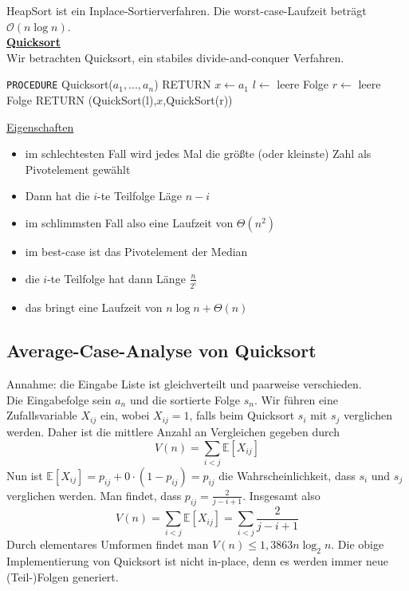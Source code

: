\documentclass[a4paper, 12pt]{article}
\begin{document}
	HeapSort ist ein Inplace-Sortierverfahren. Die worst-case-Laufzeit beträgt $\mathcal{O}(n\log n)$.\\
	\underline{\textbf{Quicksort}}\\
	Wir betrachten Quicksort, ein stabiles divide-and-conquer Verfahren.
	\begin{algorithmic}
		\State\texttt{PROCEDURE} Quicksort($a_1,...,a_n$)
			\State RETURN
		\EndIf
		\State $x\gets a_1$
		\State $l \gets$ leere Folge
		\State $r \gets$ leere Folge
			{
			\Else
			\EndIf}
		\EndFor
		\State RETURN (QuickSort(l),$x$,QuickSort(r))
	\end{algorithmic}
	\underline{Eigenschaften} \begin{itemize}
		\item im schlechtesten Fall wird jedes Mal die größte (oder kleinste) Zahl als Pivotelement gewählt
		\item Dann hat die $i$-te Teilfolge Läge $n-i$
		\item im schlimmsten Fall also eine Laufzeit von $\Theta(n^2)$
		\item im best-case ist das Pivotelement der Median
		\item die $i$-te Teilfolge hat dann Länge $\frac{n}{2^i}$ 
		\item das bringt eine Laufzeit von $n\log n + \Theta(n)$
	\end{itemize}
	\subsection{Average-Case-Analyse von Quicksort}
	Annahme: die Eingabe Liste ist gleichverteilt und paarweise verschieden.\\
	Die Eingabefolge sein $a_n$ und die sortierte Folge $s_n$. Wir führen eine Zufallsvariable $X_{ij}$ ein, wobei $X_{ij} = 1$, falls beim Quicksort $s_i$ mit $s_j$ verglichen werden. Daher ist die mittlere Anzahl an Vergleichen gegeben durch \[V(n) = \sum_{i<j}\mathbb{E}[X_{ij}]\]
	Nun ist $\mathbb{E}[X_{ij}] = p_{ij} + 0\cdot (1-p_{ij}) = p_{ij}$ die Wahrscheinlichkeit, dass $s_i$ und $s_j$ verglichen werden. Man findet, dass $p_{ij} = \frac{2}{j-i+1}$. Insgesamt also \[V(n) = \sum_{i<j} \mathbb{E}[X_{ij}] = \sum_{i<j} \frac{2}{j-i+1}\] Durch elementares Umformen findet man $V(n) \leq 1,3863n \log_2 n$. Die obige Implementierung von Quicksort ist nicht in-place, denn es werden immer neue (Teil-)Folgen generiert. 
\end{document}
